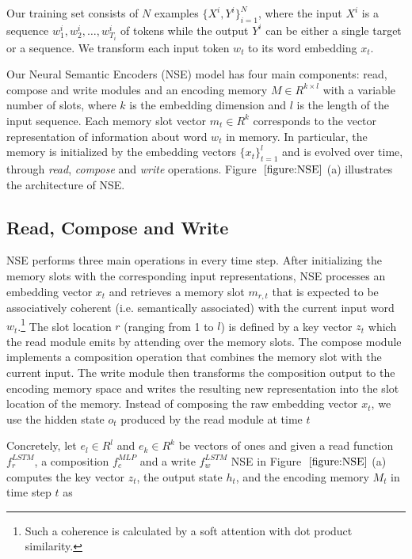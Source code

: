 \documentclass{article}
\begin{document}
Our training set consists of $N$ examples $\lbrace X^i,Y^i \rbrace^N_{i=1}$, where the input $X^i$ is a sequence $w^i_1, w^i_2, \ldots, w^i_{T_i}$ of tokens while the output $Y^i$ can be either a single target or a sequence. We transform each input token $w_t$ to its word embedding $x_t$.

Our Neural Semantic Encoders (NSE) model has four main components: read, compose and write modules and an encoding memory $M \in R^{k \times l}$ with a variable number of slots, where $k$ is the embedding dimension and $l$ is the length of the input sequence. Each memory slot vector $m_t \in R^{k}$ corresponds to the vector representation of information about word $w_t$ in memory. In particular, the memory is initialized by the embedding vectors $\lbrace x_t \rbrace^l_{t=1}$ and is evolved over time, through \textit{read}, \textit{compose} and \textit{write} operations. Figure $~\ref{figure:NSE}$ (a) illustrates the architecture of NSE.

\subsection{Read, Compose and Write}

NSE performs three main operations in every time step. After initializing the memory slots with the corresponding input representations, NSE processes an embedding vector $x_t$ and retrieves a memory slot $m_{r,t}$ that is expected to be associatively coherent (i.e. semantically associated) with the current input word $w_t$.\footnote{Such a coherence is calculated by a soft attention with dot product similarity.} The slot location $r$ (ranging from 1 to $l$) is defined by a key vector $z_t$ which the read module emits by attending over the memory slots. The compose module implements a composition operation that combines the memory slot with the current input. The write module then transforms the composition output to the encoding memory space and writes the resulting new representation into the slot location of the memory. Instead of composing the raw embedding vector $x_t$, we use the hidden state $o_t$ produced by the read module at time $t$

Concretely, let $e_l \in R^l$ and $e_k \in R^k$ be vectors of ones and given a read function $f^{LSTM}_r$, a composition $f^{MLP}_c$ and a write $f^{LSTM}_w$ NSE in Figure $~\ref{figure:NSE}$ (a) computes the key vector $z_t$, the output state $h_t$, and the encoding memory $M_t$ in time step $t$ as
\end{document}
